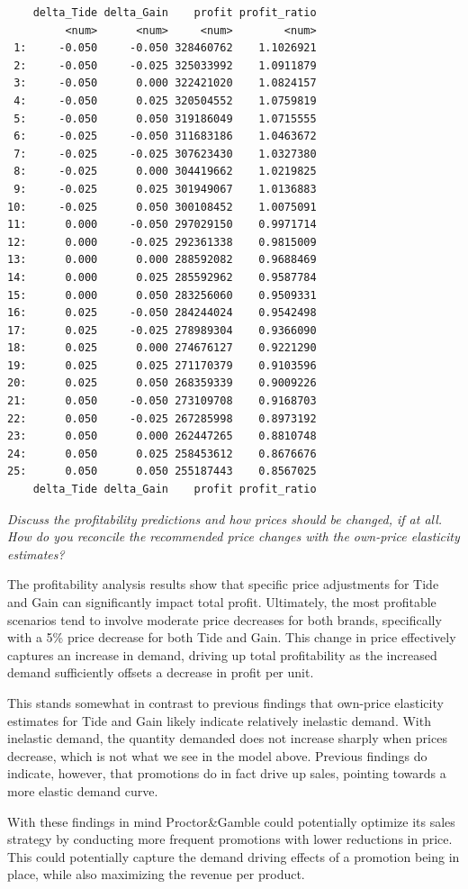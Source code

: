 \documentclass[
]{article}
\begin{document}
\begin{verbatim}
    delta_Tide delta_Gain    profit profit_ratio
         <num>      <num>     <num>        <num>
 1:     -0.050     -0.050 328460762    1.1026921
 2:     -0.050     -0.025 325033992    1.0911879
 3:     -0.050      0.000 322421020    1.0824157
 4:     -0.050      0.025 320504552    1.0759819
 5:     -0.050      0.050 319186049    1.0715555
 6:     -0.025     -0.050 311683186    1.0463672
 7:     -0.025     -0.025 307623430    1.0327380
 8:     -0.025      0.000 304419662    1.0219825
 9:     -0.025      0.025 301949067    1.0136883
10:     -0.025      0.050 300108452    1.0075091
11:      0.000     -0.050 297029150    0.9971714
12:      0.000     -0.025 292361338    0.9815009
13:      0.000      0.000 288592082    0.9688469
14:      0.000      0.025 285592962    0.9587784
15:      0.000      0.050 283256060    0.9509331
16:      0.025     -0.050 284244024    0.9542498
17:      0.025     -0.025 278989304    0.9366090
18:      0.025      0.000 274676127    0.9221290
19:      0.025      0.025 271170379    0.9103596
20:      0.025      0.050 268359339    0.9009226
21:      0.050     -0.050 273109708    0.9168703
22:      0.050     -0.025 267285998    0.8973192
23:      0.050      0.000 262447265    0.8810748
24:      0.050      0.025 258453612    0.8676676
25:      0.050      0.050 255187443    0.8567025
    delta_Tide delta_Gain    profit profit_ratio
\end{verbatim}

\bigskip

\emph{Discuss the profitability predictions and how prices should be
changed, if at all. How do you reconcile the recommended price changes
with the own-price elasticity estimates?}

The profitability analysis results show that specific price adjustments
for Tide and Gain can significantly impact total profit. Ultimately, the
most profitable scenarios tend to involve moderate price decreases for
both brands, specifically with a 5\% price decrease for both Tide and
Gain. This change in price effectively captures an increase in demand,
driving up total profitability as the increased demand sufficiently
offsets a decrease in profit per unit.

This stands somewhat in contrast to previous findings that own-price
elasticity estimates for Tide and Gain likely indicate relatively
inelastic demand. With inelastic demand, the quantity demanded does not
increase sharply when prices decrease, which is not what we see in the
model above. Previous findings do indicate, however, that promotions do
in fact drive up sales, pointing towards a more elastic demand curve.

With these findings in mind Proctor\&Gamble could potentially optimize
its sales strategy by conducting more frequent promotions with lower
reductions in price. This could potentially capture the demand driving
effects of a promotion being in place, while also maximizing the revenue
per product.
\end{document}
